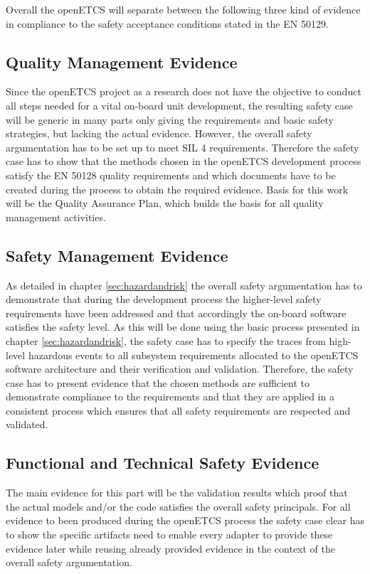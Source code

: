 \documentclass{template/openetcs_report}
\begin{document}
Overall the openETCS will separate between the following three kind of evidence in compliance to the safety acceptance conditions stated in the EN 50129. 

\subsection{Quality Management Evidence}

Since the openETCS project as a research does not have the objective to conduct all steps needed for a vital on-board unit development, the resulting safety case will be generic in many parts only giving the requirements and basic safety strategies, but lacking the actual evidence. However, the overall safety argumentation has to be set up to meet SIL 4 requirements. Therefore the safety case has to show that the methods chosen in the openETCS development process satisfy the EN 50128 quality requirements and which documents have to be created during the process to obtain the required evidence. Basis for this work will be the Quality Assurance Plan, which builds the basis for all quality management activities.

\subsection{Safety Management Evidence}

As detailed in chapter \ref{sec:hazardandrisk} the overall safety argumentation has to demonstrate that during the development process the higher-level safety requirements have been addressed and that accordingly the on-board software satisfies the safety level. As this will be done using the basic process presented in chapter \ref{sec:hazardandrisk}, the safety case has to specify the traces from high-level hazardous events to all subsystem requirements allocated to the openETCS software architecture and their verification and validation. Therefore, the safety case has to present evidence that the chosen methods are sufficient to demonstrate compliance to the requirements and that they are applied in a consistent process which ensures that all safety requirements are respected and validated.


\subsection{Functional and Technical Safety Evidence}

The main evidence for this part will be the validation results which proof that the actual models and/or the code satisfies the overall safety principals. For all evidence to been produced during the openETCS process the safety case clear has to show the specific artifacts need to enable every adapter to provide these evidence later while reusing already provided evidence in the context of the overall safety argumentation.
\end{document}
